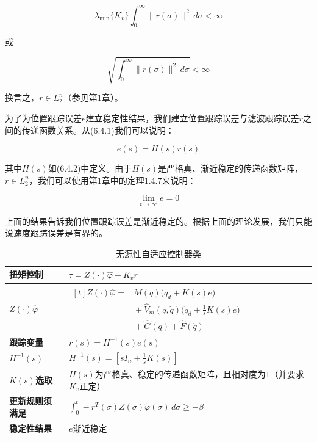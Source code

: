 \documentclass[12pt,a4paper]{ctexart}
\begin{document}
\begin{equation}\label{eq:6.4.16}
\lambda_{\min}\{K_v\}\int_0^\infty \|r(\sigma)\|^2\,d\sigma < \infty
\end{equation}

或

\begin{equation}\label{eq:6.4.17}
\sqrt{\int_0^\infty \|r(\sigma)\|^2\,d\sigma} < \infty
\end{equation}

换言之，$r \in L_{2}^{n}$（参见第1章）。

为了为位置跟踪误差$e$建立稳定性结果，我们建立位置跟踪误差与滤波跟踪误差$r$之间的传递函数关系。从(6.4.1)我们可以说明：

\begin{equation}\label{eq:6.4.18}
e(s) = H(s)r(s)
\end{equation}

其中$H(s)$如(6.4.2)中定义。由于$H(s)$是严格真、渐近稳定的传递函数矩阵，$r \in L_2^{n}$，我们可以使用第1章中的定理1.4.7来说明：

\begin{equation}\label{eq:6.4.19}
\lim_{t \to \infty} e = 0
\end{equation}

上面的结果告诉我们位置跟踪误差是渐近稳定的。根据上面的理论发展，我们只能说速度跟踪误差是有界的。

\begin{table}[H]
\centering
\caption{无源性自适应控制器类}\label{tab:6.4.1}
\renewcommand{\arraystretch}{1.22}
\begin{tabular}{|l|p{}|}
\hline
\textbf{扭矩控制} & $\displaystyle \tau = Z(\cdot)\hat{\varphi} + K_v r$ \\ \hline
\textbf{$Z(\cdot)\hat{\varphi}$} & $\displaystyle\begin{aligned}[t] Z(\cdot)\hat{\varphi} ={}& \hat{M}(q)\bigl(\ddot{q}_d + K(s)e\bigr) \\ &{}+ \hat{V}_m(q,\dot{q})\bigl(\dot{q}_d + \tfrac{1}{s}K(s)e\bigr) \\ &{}+ \hat{G}(q) + \hat{F}(\dot{q}) \end{aligned}$ \\ \hline
\textbf{跟踪变量} & $\displaystyle r(s) = H^{-1}(s)e(s)$ \\ \hline
\textbf{$H^{-1}(s)$} & $\displaystyle H^{-1}(s) = \left[sI_n + \frac{1}{s}K(s)\right]$ \\ \hline
\textbf{$K(s)$选取} & $\displaystyle H(s)$为严格真、稳定的传递函数矩阵，且相对度为$1$（并要求$\displaystyle K_v$正定） \\ \hline
\textbf{更新规则须满足} & $\displaystyle \int_0^t -r^T(\sigma)Z(\sigma)\tilde{\varphi}(\sigma)\,d\sigma \geq -\beta$ \\ \hline
\textbf{稳定性结果} & $e$渐近稳定 \\ \hline
\end{tabular}
\end{table}
\end{document}
